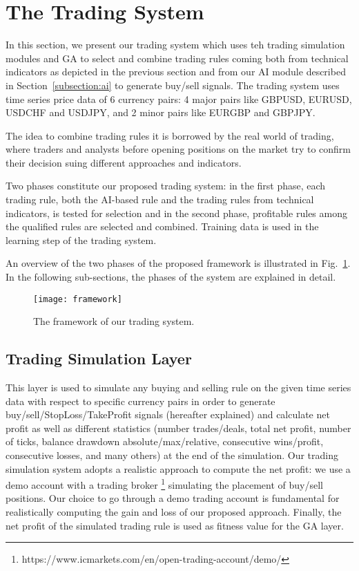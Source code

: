 \section{The Trading System}
In this section, we present our trading system which uses teh trading simulation modules and GA to select and combine trading rules coming both from technical indicators as depicted in the previous section and from our AI module described in Section~\ref{subsection:ai} to generate buy/sell signals. The trading system uses time series price data of 6 currency pairs: 4 major pairs like GBPUSD, EURUSD, USDCHF and USDJPY, and 2 minor pairs like EURGBP and GBPJPY.

The idea to combine trading rules it is borrowed by the real world of trading, where traders and analysts before opening positions on the market try to confirm their decision suing different approaches and indicators. 

Two phases constitute our proposed trading system: in the first phase, each trading rule, both the AI-based rule and the trading rules from technical indicators, is tested for selection and in the second phase, profitable rules among the qualified rules are selected and combined. Training data is used in the learning step of the trading system.

An overview of the two phases of the proposed framework is illustrated in Fig.~\ref{fig:sys}. In the following sub-sections, the phases of the system are explained in detail.

\begin{figure}[h]
\texttt{[image: framework]}
\centering
\caption{The framework of our trading system.}
\label{fig:sys} 
\end{figure}



\subsection{Trading Simulation Layer}
\label{subsection:trading}
This layer is used to simulate any buying and selling rule on the given time series data with respect to specific currency pairs in order to generate buy/sell/StopLoss/TakeProfit signals (hereafter explained) and calculate net profit as well as different statistics (number trades/deals, total net profit, number of ticks, balance drawdown absolute/max/relative, consecutive wins/profit, consecutive losses, and many others) at the end of the simulation. Our trading simulation system adopts a realistic approach to compute the net profit: we use a demo account with a trading broker \footnote{https://www.icmarkets.com/en/open-trading-account/demo/} simulating the placement of buy/sell positions. Our choice to go through a demo trading account is fundamental for realistically computing the gain and loss of our proposed approach. Finally, the net profit of the simulated trading rule is used as fitness value for the GA layer. 

